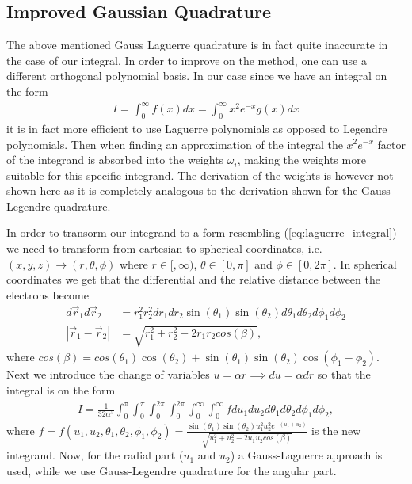 \documentclass[10pt, twocolumn]{aastex62}
\begin{document}
\subsection{Improved Gaussian Quadrature}\label{subsec:improved_gauss}
The above mentioned Gauss Laguerre quadrature is in fact quite inaccurate in the
case of our integral. In order to improve on the method, one can use a different
orthogonal polynomial basis. In our case since we have an integral on the form
\begin{align}
	I = \int^\infty_0 f(x)dx = \int^\infty_0x^2e^{-x}g(x) dx
	\label{eq:laguerre_integral}
\end{align}
it is in fact more efficient to use Laguerre polynomials as opposed to
Legendre polynomials. Then when finding an approximation of the integral the
$x^2e^{-x}$ factor of the integrand is absorbed into the weights $\omega_i$,
making the weights more suitable for this specific integrand.
The derivation of the weights is however not shown here as it is completely
analogous to the derivation shown for the Gauss-Legendre quadrature.

In order to transorm our integrand to a form resembling
(\ref{eq:laguerre_integral}) we need to transform from cartesian to spherical
coordinates, i.e. $(x, y, z)\to(r, \theta, \phi)$ where $r\in[,\infty)$,
$\theta\in[0,\pi]$ and $\phi\in[0,2\pi]$. In spherical coordinates we get that the differential and the relative distance between the
electrons become 
\begin{align}
	d\vec{r}_1d\vec{r}_2 &= r_1^2r_2^2 dr_1dr_2\sin(\theta_1)\sin(\theta_2)d\theta_1d\theta_2d\phi_1d\phi_2\\
	|\vec{r}_1 - \vec{r}_2| &= \sqrt{r_1^2 + r_2^2 - 2r_1r_2cos(\beta)},
\end{align}
where $cos(\beta) = cos(\theta_1)\cos(\theta_2) +
\sin(\theta_1)\sin(\theta_2)\cos(\phi_1 - \phi_2)$. Next we introduce the change
of variables $u = \alpha r \implies du = \alpha dr$ so that the integral is on
the form
\begin{align}
	I = \frac{1}{32 \alpha^5} \int^\pi_0\int^{\pi}_0\int^{2\pi}_0\int^{2\pi}_0\int^\infty_0\int^\infty_0 fdu_1du_2d\theta_1d\theta_2d\phi_1d\phi_2,
	\label{eq:spherical_integral}
\end{align}
where $f = f(u_1, u_2, \theta_1, \theta_2, \phi_1, \phi_2) = \frac{\sin
	(\theta_1)\sin(\theta_2)u_1^2u_2^2e^{-(u_1+u_2)}}{\sqrt{u_1^2 + u_2^2 -
	2u_1u_2cos(\beta)}}$ is the new integrand. Now, for the radial part ($u_1$
	and $u_2$) a Gauss-Laguerre approach is used, while we use Gauss-Legendre
	quadrature for the angular part. 
\end{document}
